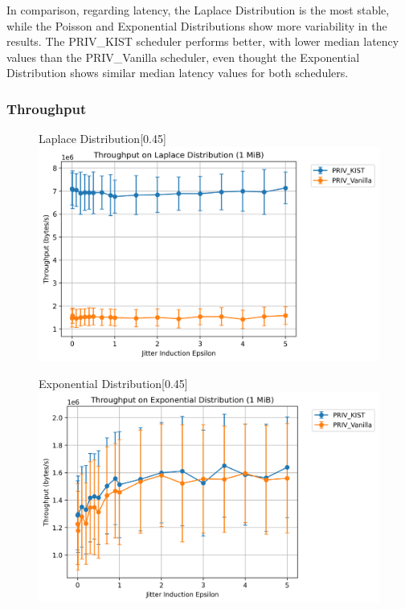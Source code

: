 In comparison, regarding latency, the Laplace Distribution is the most stable, while the Poisson and Exponential Distributions show more variability in the results. The PRIV\_KIST scheduler performs better, with lower median latency values than the PRIV\_Vanilla scheduler, even thought the Exponential Distribution shows similar median latency values for both schedulers. 

\subsubsection{Throughput}\label{sec:performance_evaluation_throughput_jitter_injectors_tor_schedulers}

\begin{figure}[htbp]
    \centering
    \begin{subcaptionbox}{Laplace Distribution\label{fig:jitter_throughput_laplace}}[0.45\textwidth]
        {\includegraphics[width=\linewidth]{Chapters/Figures/Plots/Jitter/throughput_jitter_Laplace_1_mib.png}}
    \end{subcaptionbox}
    \hfill
    \begin{subcaptionbox}{Exponential Distribution\label{fig:jitter_throughput_exponential}}[0.45\textwidth]
        {\includegraphics[width=\linewidth]{Chapters/Figures/Plots/Jitter/throughput_jitter_Exponential_1_mib.png}}

\end{subcaptionbox}
\end{figure}
